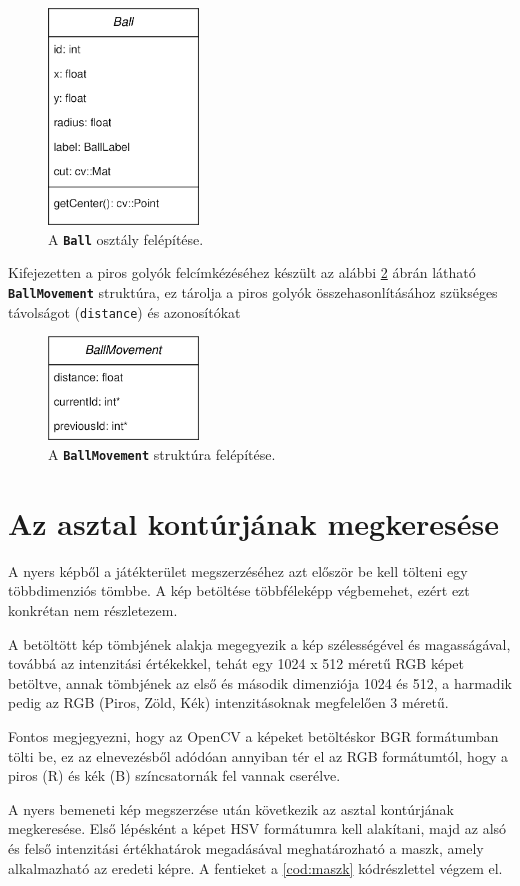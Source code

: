 \begin{figure}[!ht]
    \centering
    \includegraphics[width=40mm, keepaspectratio]{figures/ball_class.png}
    \caption{A \textbf{\lstinline{Ball}} osztály felépítése.}
    \label{fig:ball_class}
\end{figure}

\par Kifejezetten a piros golyók felcímkézéséhez készült az alábbi \ref{fig:ballmovement_struct} ábrán látható \textbf{\lstinline{BallMovement}} struktúra, ez tárolja a piros golyók összehasonlításához szükséges távolságot (\lstinline{distance}) és azonosítókat 

\begin{figure}[!ht]
    \centering
    \includegraphics[width=40mm, keepaspectratio]{figures/ballmovement_class.png}
    \caption{A \textbf{\lstinline{BallMovement}} struktúra felépítése.}
    \label{fig:ballmovement_struct}
\end{figure}

\section{Az asztal kontúrjának megkeresése}
\label{section:megv_asztal_kontur}
A nyers képből a játékterület megszerzéséhez azt először be kell tölteni egy többdimenziós tömbbe. A kép betöltése többféleképp végbemehet, ezért ezt konkrétan nem részletezem.
\par A betöltött kép tömbjének alakja megegyezik a kép szélességével és magasságával, továbbá az intenzitási értékekkel, tehát egy 1024 x 512 méretű RGB képet betöltve, annak tömbjének az első és második dimenziója 1024 és 512, a harmadik pedig az RGB (Piros, Zöld, Kék) intenzitásoknak megfelelően 3 méretű.
\par Fontos megjegyezni, hogy az OpenCV a képeket betöltéskor BGR formátumban tölti be, ez az elnevezésből adódóan annyiban tér el az RGB formátumtól, hogy a piros (R) és kék (B) színcsatornák fel vannak cserélve.
\par A nyers bemeneti kép megszerzése után következik az asztal kontúrjának megkeresése. Első lépésként a képet HSV formátumra kell alakítani, majd az alsó és felső intenzitási értékhatárok megadásával meghatározható a maszk, amely alkalmazható az eredeti képre.
\newline A fentieket a \ref{cod:maszk} kódrészlettel végzem el.


